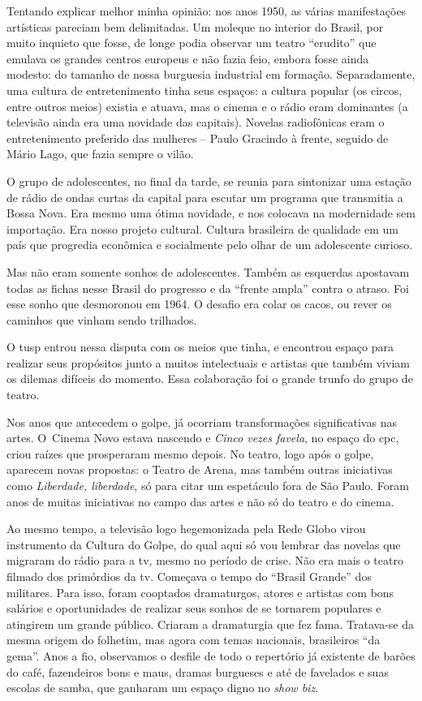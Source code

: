 {Tentando explicar melhor minha opinião: nos anos 1950, as várias
manifestações artísticas pareciam bem delimitadas. Um moleque no
interior do Brasil, por muito inquieto que fosse, de longe podia
observar um teatro “erudito” que emulava os grandes centros europeus e
não fazia feio, embora fosse ainda modesto: do tamanho de nossa burguesia
industrial em formação. Separadamente, uma cultura de entretenimento
tinha seus espaços: a cultura popular (os circos, entre outros meios)
existia e atuava, mas o cinema e o rádio eram dominantes (a televisão
ainda era uma novidade das capitais). Novelas radiofônicas eram o
entretenimento preferido das mulheres -- Paulo Gracindo à frente,
seguido de Mário Lago, que fazia sempre o vilão.

O grupo de adolescentes, no final da tarde, se reunia para
sintonizar uma estação de rádio de ondas curtas da capital para escutar
um programa que transmitia a Bossa Nova. Era mesmo uma ótima novidade,
e nos colocava na modernidade sem importação. Era nosso projeto
cultural. Cultura brasileira de qualidade em um país que progredia
econômica e socialmente pelo olhar de um adolescente curioso.

Mas não eram somente sonhos de adolescentes. Também as esquerdas apostavam
todas as fichas nesse Brasil do progresso e da “frente ampla” contra o
atraso. Foi esse sonho que desmoronou em 1964. O desafio era colar os cacos,
ou rever os caminhos que vinham sendo trilhados.

O {\sc tusp} entrou nessa disputa com os meios que tinha, e
encontrou espaço para realizar seus propósitos junto a muitos
intelectuais e artistas que também viviam os dilemas difíceis do
momento. Essa colaboração foi o grande trunfo do grupo de teatro.

Nos anos que antecedem o golpe, já ocorriam transformações
significativas nas artes. O~Cinema Novo estava nascendo e {\it Cinco vezes favela},
no espaço do {\sc cpc}, criou raízes que prosperaram mesmo depois. No teatro,
logo após o golpe, aparecem novas propostas: o Teatro de Arena, mas também
outras iniciativas como {\it Liberdade, liberdade}, só para citar um
espetáculo fora de São Paulo. Foram anos de muitas iniciativas no campo
das artes e não só do teatro e do cinema.

Ao mesmo tempo, a televisão logo hegemonizada pela Rede Globo virou
instrumento da Cultura do Golpe, do qual aqui só vou lembrar das novelas
que migraram do rádio para a {\sc tv}, mesmo no período de crise. Não era mais o
teatro filmado dos primórdios da {\sc tv}. Começava o tempo do “Brasil
Grande” dos militares. Para isso, foram cooptados dramaturgos, atores e
artistas com bons salários e oportunidades de realizar seus sonhos de
se tornarem populares e atingirem um grande público. Criaram a
dramaturgia que fez fama. Tratava-se da mesma origem do folhetim, mas agora com temas
nacionais, brasileiros “da gema”. Anos a fio, observamos o desfile de todo o
repertório já existente de barões do café, fazendeiros bons e maus,
dramas burgueses e até de favelados e suas escolas de samba, que ganharam um
espaço digno no {\it show biz}.

}
